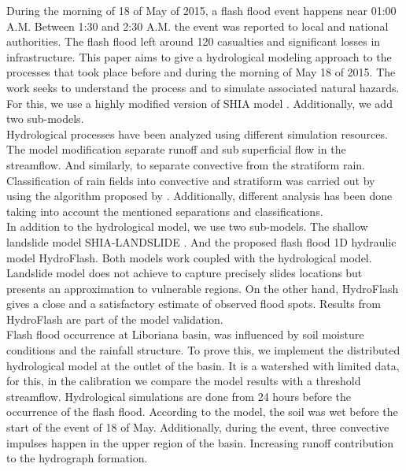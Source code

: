 {During the morning of 18 of May of 2015, a flash flood event happens near 01:00 A.M.  Between 1:30 and 2:30 A.M. the event was reported to local and national authorities. The flash flood left around 120 casualties and significant losses in infrastructure. This paper aims to give a hydrological modeling approach to the processes that took place before and during the morning of May 18 of 2015.  The work seeks to understand the process and to simulate associated natural hazards. For this, we use a highly modified version of SHIA model \citep{Frances2007b}.  Additionally, we add two sub-models.\\  

Hydrological processes have been analyzed using different simulation resources.  The model modification separate runoff and sub superficial flow in the streamflow.  And similarly, to separate convective from the stratiform rain.  Classification of rain fields into convective and stratiform was carried out by using the algorithm proposed by \citet{Steiner1995}.   Additionally, different analysis has been done taking into account the mentioned separations and classifications.\\ 

In addition to the hydrological model, we use two sub-models. The shallow landslide model SHIA-LANDSLIDE \citep{Aristizabal2016}. And the proposed flash flood 1D hydraulic model HydroFlash.  Both models work coupled with the hydrological model.  Landslide model does not achieve to capture precisely slides locations but presents an approximation to vulnerable regions.  On the other hand, HydroFlash gives a close and a satisfactory estimate of observed flood spots.  Results from HydroFlash are part of the model validation.\\    

Flash flood occurrence at Liboriana basin, was influenced by soil moisture conditions and the rainfall structure.  To prove this, we implement the distributed hydrological model at the outlet of the basin.  It is a watershed with limited data, for this, in the calibration we compare the model results with a threshold streamflow.   Hydrological simulations are done from 24 hours before the occurrence of the flash flood.  According to the model, the soil was wet before the start of the event of 18 of May.  Additionally, during the event, three convective impulses happen in the upper region of the basin.  Increasing runoff contribution to the hydrograph formation.\\

}
